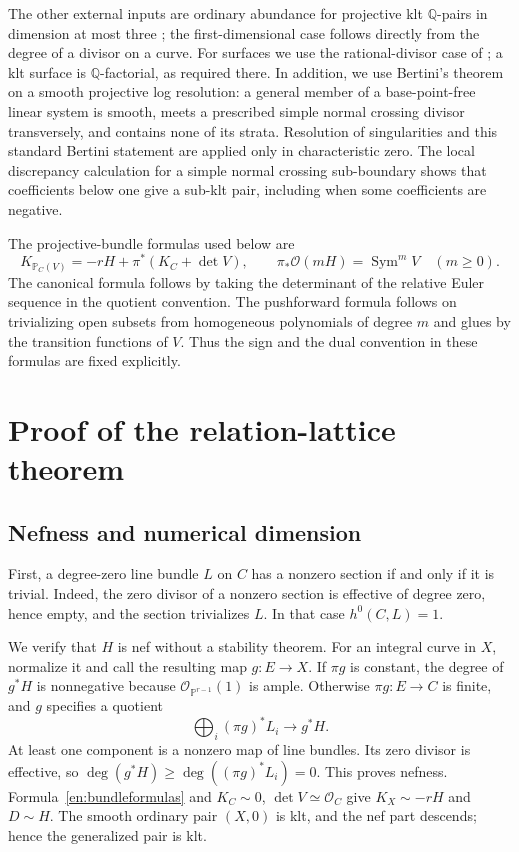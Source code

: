 \documentclass[12pt]{amsart}
\theoremstyle{definition}
\theoremstyle{remark}
\numberwithin{equation}{section}
\newcommand{\cO}{\mathcal{O}}
\DeclareMathOperator{\Sym}{Sym}
\newcommand{\Q}{\mathbb{Q}}
\newcommand{\mP}{\mathbb{P}}
\begin{document}
The other external inputs are ordinary abundance for projective klt $\Q$-pairs in dimension at most three \cite{en-Fuj,en-KMM}; the first-dimensional case follows directly from the degree of a divisor on a curve. For surfaces we use the rational-divisor case of \cite[Theorem 6.1]{en-Fuj}; a klt surface is $\Q$-factorial, as required there. In addition, we use Bertini's theorem on a smooth projective log resolution: a general member of a base-point-free linear system is smooth, meets a prescribed simple normal crossing divisor transversely, and contains none of its strata. Resolution of singularities and this standard Bertini statement are applied only in characteristic zero. The local discrepancy calculation for a simple normal crossing sub-boundary shows that coefficients below one give a sub-klt pair, including when some coefficients are negative.

The projective-bundle formulas used below are
\begin{equation}\label{en:bundleformulas}
 K_{\mP_C(V)}=-rH+\pi^*(K_C+\det V),\qquad
 \pi_*\cO(mH)=\Sym^m V\quad(m\geq0).
\end{equation}
The canonical formula follows by taking the determinant of the relative Euler sequence in the quotient convention. The pushforward formula follows on trivializing open subsets from homogeneous polynomials of degree $m$ and glues by the transition functions of $V$. Thus the sign and the dual convention in these formulas are fixed explicitly.

\section{Proof of the relation-lattice theorem}\label{en:proof}
\subsection{Nefness and numerical dimension}
First, a degree-zero line bundle $L$ on $C$ has a nonzero section if and only if it is trivial. Indeed, the zero divisor of a nonzero section is effective of degree zero, hence empty, and the section trivializes $L$. In that case $h^0(C,L)=1$.

We verify that $H$ is nef without a stability theorem. For an integral curve in $X$, normalize it and call the resulting map $g:E\to X$. If $\pi g$ is constant, the degree of $g^*H$ is nonnegative because $\cO_{\mP^{r-1}}(1)$ is ample. Otherwise $\pi g:E\to C$ is finite, and $g$ specifies a quotient
\[
 \bigoplus_i(\pi g)^*L_i\longrightarrow g^*H.
\]
At least one component is a nonzero map of line bundles. Its zero divisor is effective, so $\deg(g^*H)\geq\deg((\pi g)^*L_i)=0$. This proves nefness. Formula~\eqref{en:bundleformulas} and $K_C\sim0$, $\det V\simeq\cO_C$ give $K_X\sim-rH$ and $D\sim H$. The smooth ordinary pair $(X,0)$ is klt, and the nef part descends; hence the generalized pair is klt.
\end{document}
